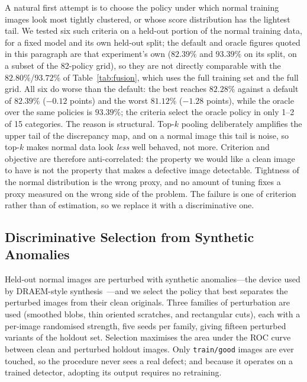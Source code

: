A natural first attempt is to choose the policy under which normal training images
look most tightly clustered, or whose score distribution has the lightest tail. We
tested six such criteria on a held-out portion of the normal training data, for a
fixed model and its own held-out split; the default and oracle figures quoted in
this paragraph are that experiment's own ($82.39\%$ and $93.39\%$ on its split, on
a subset of the 82-policy grid), so they are not directly comparable with the
$82.80\%$/$93.72\%$ of Table~\ref{tab:fusion}, which uses the full training set
and the full grid. All six do worse than the default: the best
reaches $82.28\%$ against a default of $82.39\%$ ($-0.12$ points) and the worst
$81.12\%$ ($-1.28$ points), while the oracle over the same policies is $93.39\%$;
the criteria select the oracle policy in only 1--2 of 15 categories. The reason is
structural. Top-$k$ pooling deliberately amplifies the upper tail of the
discrepancy map, and on a normal image this tail is noise, so top-$k$ makes normal
data look \emph{less} well behaved, not more. Criterion and objective are therefore
anti-correlated: the property we would like a clean image to have is not the
property that makes a defective image detectable. Tightness of the normal
distribution is the wrong proxy, and no amount of tuning fixes a proxy measured on
the wrong side of the problem. The failure is one of criterion rather than of
estimation, so we replace it with a discriminative one.

\subsection{Discriminative Selection from Synthetic Anomalies}
\label{subsec:pseudo_results}

Held-out normal images are perturbed with synthetic anomalies---the device used
by DRAEM-style synthesis~\cite{zavrtanik2021draem}---and we select the policy
that best separates the perturbed images from their clean originals. Three
families of perturbation are used (smoothed blobs, thin oriented scratches, and
rectangular cuts), each with a per-image randomised strength, five seeds per
family, giving fifteen perturbed variants of the holdout set. Selection maximises
the area under the ROC curve between clean and perturbed holdout images. Only
\texttt{train/good} images are ever touched, so the procedure never sees a real
defect; and because it operates on a trained detector, adopting its output
requires no retraining.

